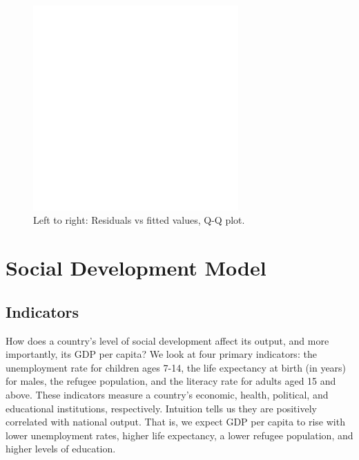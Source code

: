 \documentclass[11pt]{article}
\begin{document}
\begin{figure}[!ht]
  \centering
  \includegraphics[width=0.7\textwidth]{images/science_model_conditions}
  \caption{\label{science_model_conditions}Left to right: Residuals vs fitted values, Q-Q plot.}
\end{figure}


\section{Social Development Model}
\label{sec:model_social}

\subsection{Indicators}
How does a country's level of social development affect its output, and more importantly, its GDP per capita?
We look at four primary indicators: the unemployment rate for children ages 7-14, the life expectancy at birth (in years) for males, the refugee population, and the literacy rate for adults aged 15 and above.
These indicators measure a country's economic, health, political, and educational institutions, respectively.
Intuition tells us they are positively correlated with national output.
That is, we expect GDP per capita to rise with lower unemployment rates, higher life expectancy, a lower refugee population, and higher levels of education.
\end{document}

